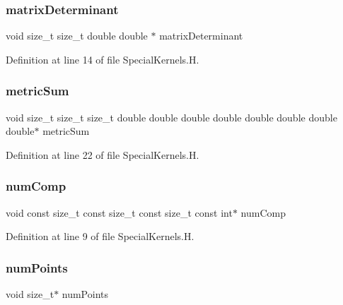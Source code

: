 \subsubsection{\texorpdfstring{matrix\+Determinant}{matrixDeterminant}}
{\footnotesize\ttfamily void size\+\_\+t size\+\_\+t double double $\ast$ matrix\+Determinant}



Definition at line 14 of file Special\+Kernels.\+H.

\hypertarget{SpecialKernels_8H_a0340a724362a31a98b845deab71cda83}{}\label{SpecialKernels_8H_a0340a724362a31a98b845deab71cda83} 
\subsubsection{\texorpdfstring{metric\+Sum}{metricSum}}
{\footnotesize\ttfamily void size\+\_\+t size\+\_\+t size\+\_\+t double double double double double double double double$\ast$ metric\+Sum}



Definition at line 22 of file Special\+Kernels.\+H.

\hypertarget{SpecialKernels_8H_a0ca5e89863a7ef42a6955add3ff97cae}{}\label{SpecialKernels_8H_a0ca5e89863a7ef42a6955add3ff97cae} 
\subsubsection{\texorpdfstring{num\+Comp}{numComp}}
{\footnotesize\ttfamily void const size\+\_\+t const size\+\_\+t const size\+\_\+t const int$\ast$ num\+Comp}



Definition at line 9 of file Special\+Kernels.\+H.

\hypertarget{SpecialKernels_8H_a759837aca0b634db3456eb90c861fd4a}{}\label{SpecialKernels_8H_a759837aca0b634db3456eb90c861fd4a} 
\subsubsection{\texorpdfstring{num\+Points}{numPoints}}
{\footnotesize\ttfamily void size\+\_\+t$\ast$ num\+Points}



